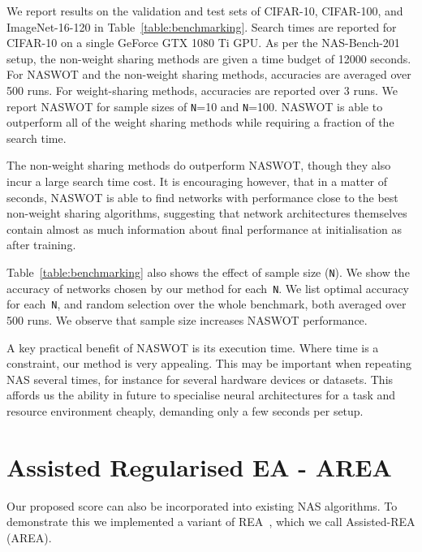 \documentclass{article}
\begin{document}
We report results on the validation and test sets of CIFAR-10, CIFAR-100, and ImageNet-16-120 in Table~\ref{table:benchmarking}. Search times are reported for CIFAR-10 on a single GeForce GTX 1080 Ti GPU. As per the NAS-Bench-201 setup, the non-weight sharing methods are given a time budget of 12000 seconds. For NASWOT and the non-weight sharing methods, accuracies are averaged over 500 runs. For weight-sharing methods, accuracies are reported over 3 runs. We report NASWOT for sample sizes of \texttt{N}=10 and \texttt{N}=100. NASWOT is able to outperform all of the weight sharing methods while requiring a fraction of the search time.




The non-weight sharing methods do outperform NASWOT, though they also incur a large search time cost. It is encouraging however, that in a matter of seconds, NASWOT is able to find networks with performance close to the best non-weight sharing algorithms, suggesting that network architectures themselves contain almost as much information about final performance at initialisation as after training. 



Table~\ref{table:benchmarking} also shows the effect of sample size (\texttt{N}). We show the accuracy of networks chosen by our method for each~\texttt{N}. We list optimal accuracy for each~\texttt{N}, and random selection over the whole benchmark, both averaged over 500 runs. We observe that sample size increases NASWOT performance.

A key practical benefit of NASWOT is its execution time. Where time is a constraint, our method is very appealing. This may be important when repeating NAS several times, for instance for several hardware devices or datasets. This affords us the ability in future to specialise neural architectures for a task and resource environment cheaply, demanding only a few seconds per setup. 



\vspace{-4mm}
\section{Assisted Regularised EA - AREA}
\label{sec:area}

Our proposed score can also be incorporated into existing NAS algorithms. To demonstrate this we implemented a variant of REA~\citep{real2019regularized}, which we call Assisted-REA (AREA).
\end{document}
